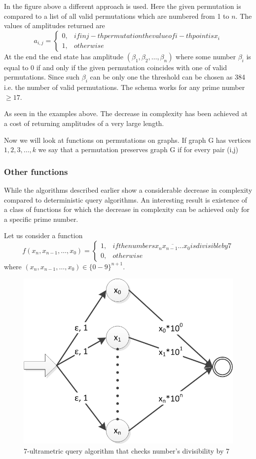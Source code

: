 \documentclass{llncs}
\begin{document}
In the figure above a different approach is used. Here the given permutation is compared to a list of all valid permutations which are numbered from 1 to $n$. The values of amplitudes returned are
$$a_{i,j}=\begin{cases}
0, & if in j-th permutation the value of i-th point is x_i \\
1, & otherwise
\end{cases}$$
At the end the end state has amplitude $(\beta_1,\beta_2,\dots,\beta_n)$ where some number $\beta_i$ is equal to 0 if and only if the given permutation coincides with one of valid permutations. Since such $\beta_i$ can be only one the threshold can be chosen as 384 i.e. the number of valid permutations. The schema works for any prime number $\geq 17$.

As seen in the examples above. The decrease in complexity has been achieved at a cost of returning amplitudes of a very large length.

Now we will look at functions on permutations on graphs. If graph G has vertices $1,2,3,\dots,k$ we say that a permutation preserves graph G if for every pair (i,j)

\subsubsection{Other functions}
While the algorithms described earlier show a considerable decrease in complexity compared to deterministic query algorithms. An interesting result is existence of a class of functions for which the decrease in complexity can be achieved only for a specific prime number.

Let us consider a function
$$
f(x_n,x_{n-1},\dots,x_0)=\begin{cases}
1, & if the numbers \overline{x_nx_{n-1}\dots x_0} is divisible by 7 \\
0, & otherwise
\end{cases}
$$
where $(x_n,x_{n-1},\dots,x_0) \in \{0-9\}^{n+1}$.
\begin{figure}
	\centering
	\includegraphics{divisibility.png}
	\caption{$7$-ultrametric query algorithm that checks number's divisibility by 7}
	  \label{div}
\end{figure}
\end{document}
